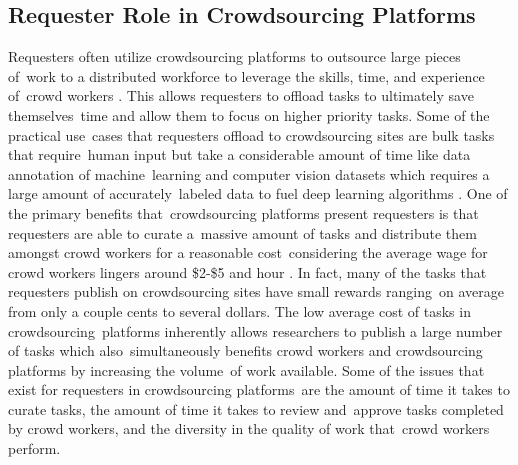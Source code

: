 \documentclass[letterpaper,12pt]{article}
\begin{document}
\subsection{Requester Role in Crowdsourcing Platforms}
Requesters often utilize crowdsourcing platforms to outsource large pieces of\ 
work to a distributed workforce to leverage the skills, time, and experience of\ 
crowd workers \cite{kuek2015global}. This allows requesters to offload tasks to ultimately save themselves\ 
time and allow them to focus on higher priority tasks. Some of the practical use\ 
cases that requesters offload to crowdsourcing sites are bulk tasks that require\ 
human input but take a considerable amount of time like data annotation of machine\ 
learning and computer vision datasets which requires a large amount of accurately\ 
labeled data to fuel deep learning algorithms \cite{hitlin2016research}. One of the primary benefits that\
crowdsourcing platforms present requesters is that requesters are able to curate a\ 
massive amount of tasks and distribute them amongst crowd workers for a reasonable cost\ 
considering the average wage for crowd workers lingers around \$2-\$5 and hour \cite{Kaplan2018,hara2018data}.
In fact, many of the tasks that requesters publish on crowdsourcing sites have small rewards ranging\
on average from only a couple cents to several dollars. The low average cost of tasks in crowdsourcing\
platforms inherently allows researchers to publish a large number of tasks which also\
simultaneously benefits crowd workers and crowdsourcing platforms by increasing the volume\
of work available. Some of the issues that exist for requesters in crowdsourcing platforms\
are the amount of time it takes to curate tasks, the amount of time it takes to review and\
approve tasks completed by crowd workers, and the diversity in the quality of work that\
crowd workers perform.
\end{document}
